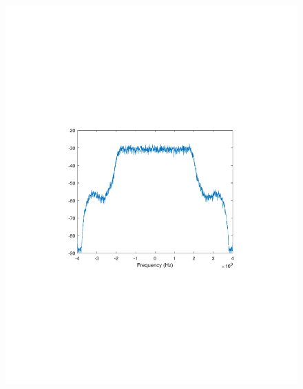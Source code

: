 \begin{refsection}
\begin{figure}[H]
	\centering
	\begin{minipage}{0.30\textwidth}
		\centering
		\includegraphics[clip, trim=4cm 8cm 4cm 8cm, width=1\textwidth]{./sdf/m_qam_system/figures/expResults/homodyne/5_4GBdInSig13dBc_AfPE1.pdf}
		\label{fig:4GBdEyePE1}
	\end{minipage}
	\begin{minipage}{0.30\textwidth}
		\centering

\end{minipage}
\end{figure}
\end{refsection}
